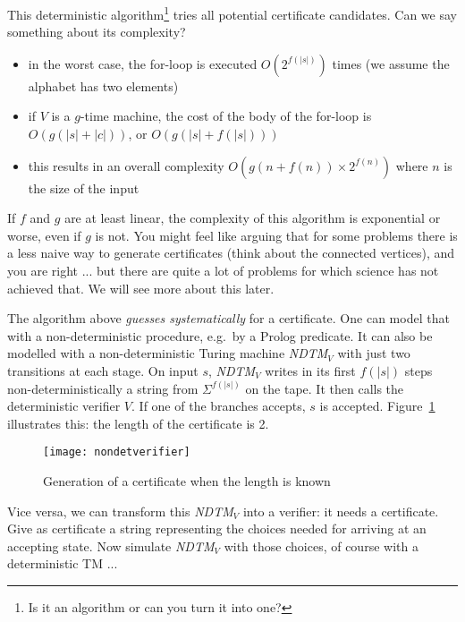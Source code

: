 \begin{algorithmic}
         \EndIf
    \EndFor
\end{algorithmic}

This deterministic algorithm\footnote{Is it an algorithm or can you
turn it into one?} tries all potential certificate candidates. Can we
say something about its complexity?


\begin{itemize}
\item
in the worst case, the for-loop is executed $O(2^{f(|s|)})$ times (we assume
the alphabet has two elements)
\item
if $V$ is a $g$-time machine, the cost of the body of the for-loop is
$O(g(|s|+|c|))$, or $O(g(|s|+f(|s|)))$
\item
this results in an overall complexity $O(g(n+f(n))\times 2^{f(n)})$
where $n$ is the size of the input
\end{itemize}

If $f$ and $g$ are at least linear, the complexity of this algorithm
is exponential or worse, even if $g$ is not. You might feel like
arguing that for some problems there is a less naive way to generate
certificates (think about the connected vertices), and you are right
... but there are quite a lot of problems for which science has not
achieved that. We will see more about this later.

The algorithm above {\em guesses systematically} for a
certificate. One can model that with a non-deterministic procedure,
e.g.\ by a Prolog predicate. It can also be modelled with a
non-deterministic Turing machine {\em NDTM$_V$} with just two
transitions at each stage. On input $s$, {\em NDTM$_V$} writes in its
first $f(|s|)$ steps non-deterministically a string from
$\Sigma^{f(|s|)}$ on the tape. It then calls the deterministic
verifier $V$. If one of the branches accepts, $s$ is accepted.
Figure~\ref{nondetverifier} illustrates this: the length of the
certificate is 2.


\begin{figure}[h]
	\centering
	\texttt{[image: nondetverifier]}
	\caption{Generation of a certificate when the length is
	known}\label{nondetverifier}
\end{figure}

Vice versa, we can transform this {\em NDTM$_V$} into a verifier: it
needs a certificate. Give as certificate a string representing the
choices needed for arriving at an accepting state. Now simulate
{\em NDTM$_V$} with those choices, of course with a deterministic TM
...

